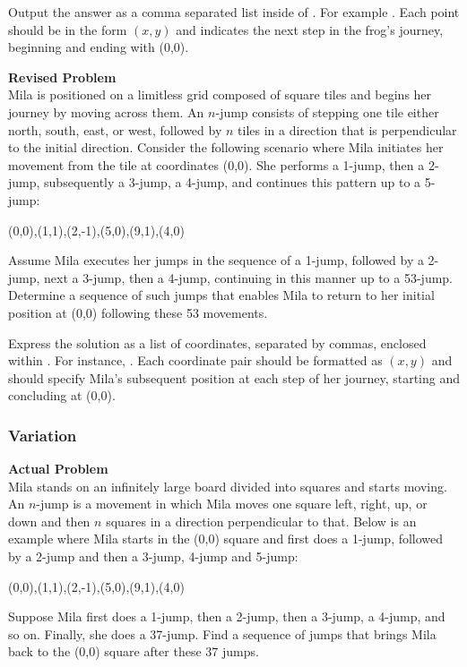 Output the answer as a comma separated list inside of . For example . Each point should be in the form $(x, y)$ and indicates the next step in the frog's journey, beginning and ending with (0,0).

\textbf{Revised Problem}\\
Mila is positioned on a limitless grid composed of square tiles and begins her journey by moving across them. An $n$-jump consists of stepping one tile either north, south, east, or west, followed by $n$ tiles in a direction that is perpendicular to the initial direction. Consider the following scenario where Mila initiates her movement from the tile at coordinates (0,0). She performs a 1-jump, then a 2-jump, subsequently a 3-jump, a 4-jump, and continues this pattern up to a 5-jump:

(0,0),(1,1),(2,-1),(5,0),(9,1),(4,0)

Assume Mila executes her jumps in the sequence of a 1-jump, followed by a 2-jump, next a 3-jump, then a 4-jump, continuing in this manner up to a 53-jump. Determine a sequence of such jumps that enables Mila to return to her initial position at (0,0) following these 53 movements.

Express the solution as a list of coordinates, separated by commas, enclosed within . For instance, . Each coordinate pair should be formatted as $(x, y)$ and should specify Mila's subsequent position at each step of her journey, starting and concluding at (0,0).

\subsubsection{Variation}
\textbf{Actual Problem}\\
Mila stands on an infinitely large board divided into squares and starts moving. An $n$-jump is a movement in which Mila moves one square left, right, up, or down and then $n$ squares in a direction perpendicular to that. Below is an example where Mila starts in the (0,0) square and first does a 1-jump, followed by a 2-jump and then a 3-jump, 4-jump and 5-jump:

(0,0),(1,1),(2,-1),(5,0),(9,1),(4,0)

Suppose Mila first does a 1-jump, then a 2-jump, then a 3-jump, a 4-jump, and so on. Finally, she does a 37-jump. Find a sequence of jumps that brings Mila back to the (0,0) square after these $37$ jumps.

